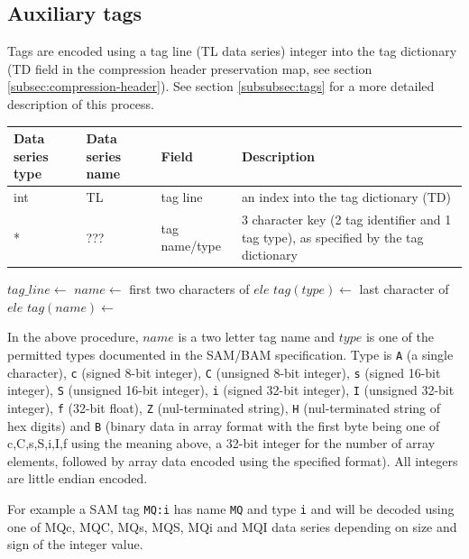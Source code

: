\documentclass[a4paper]{article}
\begin{document}
\subsection{Auxiliary tags}
\label{subsec:tags}

Tags are encoded using a tag line (TL data series) integer into the tag dictionary (TD field in the compression header preservation map, see section \ref{subsec:compression-header}).
See section \ref{subsubsec:tags} for a more detailed description of this process.

\begin{tabular}{|>{\raggedright}p{70pt}|>{\raggedright}p{75pt}|>{\raggedright}p{90pt}|>{\raggedright}p{200pt}|}
\hline
\textbf{Data series type} & \textbf{Data series name} & \textbf{Field} & \textbf{Description}\tabularnewline
\hline
int & TL & tag line & an index into the tag dictionary (TD)\tabularnewline
\hline
* & ??? & tag name/type & 3 character key (2 tag identifier and 1 tag type), as specified by the tag dictionary\tabularnewline
\hline
\end{tabular}

\vskip 20pt
\begin{algorithmic}[1]
\State $tag\_line\gets$ 
  \State $name\gets$ first two characters of $ele$
  \State $tag(type)\gets$ last character of $ele$
  \State $tag(name)\gets$ 
\EndFor
\EndProcedure
\end{algorithmic}

In the above procedure, $name$ is a two letter tag name and $type$ is one of the permitted types documented in the SAM/BAM specification.
Type is \texttt{A} (a single character), \texttt{c} (signed 8-bit integer), \texttt{C} (unsigned 8-bit integer), \texttt{s} (signed 16-bit integer), \texttt{S} (unsigned 16-bit integer), \texttt{i} (signed 32-bit integer), \texttt{I} (unsigned 32-bit integer), \texttt{f} (32-bit float), \texttt{Z} (nul-terminated string), \texttt{H} (nul-terminated string of hex digits) and \texttt{B} (binary data in array format with the first byte being one of c,C,s,S,i,I,f using the meaning above, a 32-bit integer for the number of array elements, followed by array data encoded using the specified format).  All integers are little endian encoded.

For example a SAM tag \texttt{MQ:i} has name \texttt{MQ} and type \texttt{i} and will be decoded using one of MQc, MQC, MQs, MQS, MQi and MQI data series depending on size and sign of the integer value.
\end{document}
